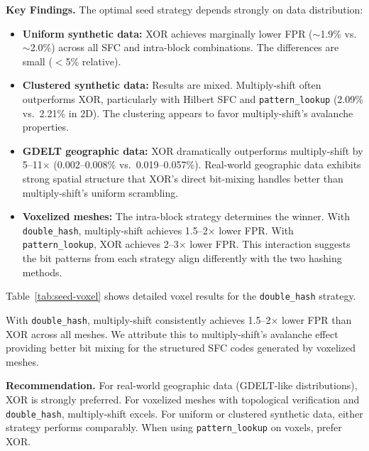 \documentclass[conference,a4paper]{IEEEtran}
\begin{document}
\textbf{Key Findings.} The optimal seed strategy depends strongly on data distribution:

\begin{itemize}
    \item \textbf{Uniform synthetic data:} XOR achieves marginally lower FPR ($\sim$1.9\% vs.\ $\sim$2.0\%) across all SFC and intra-block combinations. The differences are small ($<$5\% relative).

    \item \textbf{Clustered synthetic data:} Results are mixed. Multiply-shift often outperforms XOR, particularly with Hilbert SFC and \texttt{pattern\_lookup} (2.09\% vs.\ 2.21\% in 2D). The clustering appears to favor multiply-shift's avalanche properties.

    \item \textbf{GDELT geographic data:} XOR dramatically outperforms multiply-shift by 5--11$\times$ (0.002--0.008\% vs.\ 0.019--0.057\%). Real-world geographic data exhibits strong spatial structure that XOR's direct bit-mixing handles better than multiply-shift's uniform scrambling.

    \item \textbf{Voxelized meshes:} The intra-block strategy determines the winner. With \texttt{double\_hash}, multiply-shift achieves 1.5--2$\times$ lower FPR. With \texttt{pattern\_lookup}, XOR achieves 2--3$\times$ lower FPR. This interaction suggests the bit patterns from each strategy align differently with the two hashing methods.
\end{itemize}

Table~\ref{tab:seed-voxel} shows detailed voxel results for the \texttt{double\_hash} strategy.



With \texttt{double\_hash}, multiply-shift consistently achieves 1.5--2$\times$ lower FPR than XOR across all meshes. We attribute this to multiply-shift's avalanche effect providing better bit mixing for the structured SFC codes generated by voxelized meshes.

\textbf{Recommendation.} For real-world geographic data (GDELT-like distributions), XOR is strongly preferred. For voxelized meshes with topological verification and \texttt{double\_hash}, multiply-shift excels. For uniform or clustered synthetic data, either strategy performs comparably. When using \texttt{pattern\_lookup} on voxels, prefer XOR.
\end{document}
